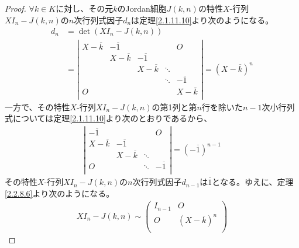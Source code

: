 \documentclass[dvipdfmx]{jsarticle}
\begin{document}
\begin{proof}
$\forall k \in K$に対し、その元$k$のJordan細胞$J(k,n)$の特性$X$-行列$XI_{n} - J(k,n)$の$n$次行列式因子$d_{n}$は定理\ref{2.1.11.10}より次のようになる。
\begin{align*}
d_{n} &= \det\left( XI_{n} - J(k,n) \right)\\
&= \left| \begin{matrix}
X - \overline{k} & - \overline{1} & \  & \  & O \\
\  & X - \overline{k} & - \overline{1} & \  & \  \\
\  & \  & X - \overline{k} & \ddots & \  \\
\  & \  & \  & \ddots & - \overline{1} \\
O & \  & \  & \  & X - \overline{k} \\
\end{matrix} \right| = \left( X - \overline{k} \right)^{n}
\end{align*}
一方で、その特性$X$-行列$XI_{n} - J(k,n)$の第1列と第$n$行を除いた$n - 1$次小行列式については定理\ref{2.1.11.10}より次のとおりであるから、
\begin{align*}
\left| \begin{matrix}
 - \overline{1} & \  & \  & O \\
X - \overline{k} & - \overline{1} & \  & \  \\
\  & X - \overline{k} & \ddots & \  \\
O & \  & \ddots & - \overline{1} \\
\end{matrix} \right| = \left( - \overline{1} \right)^{n - 1}
\end{align*}
その特性$X$-行列$XI_{n} - J(k,n)$の$n$次行列式因子$d_{n - 1}$は$\overline{1}$となる。ゆえに、定理\ref{2.2.8.6}より次のようになる。
\begin{align*}
XI_{n} - J(k,n) \sim \begin{pmatrix}
I_{n - 1} & O \\
O & \left( X - \overline{k} \right)^{n} \\
\end{pmatrix}
\end{align*}
\end{proof}
\end{document}
